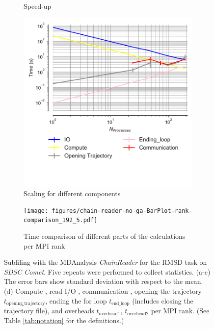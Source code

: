 \begin{figure}[!htb]
\begin{subfigure}{.4\textwidth}
  \caption{Speed-up}
  \label{fig:MPIspeedup-chain-reader}
\end{subfigure}
\bigskip
\begin{subfigure}{.45\textwidth}
  \includegraphics[width=\linewidth]{figures/IO_compute_scaling_traj_splitting-chain-reader.pdf}
  \captionsetup{format=hang}
  \caption{Scaling for different components}
  \label{fig:MPIscaling-chain-reader}
\end{subfigure}
\hfill
\begin{subfigure}{.5\textwidth}
  \texttt{[image: figures/chain-reader-no-ga-BarPlot-rank-comparison\_192\_5.pdf]}
  \captionsetup{format=hang}
  \caption{Time comparison of different parts of the calculations per MPI rank}
  \label{fig:MPIranks-split-chain-reader}
\end{subfigure}

\caption{Subfiling with the MDAnalysis \emph{ChainReader} for the RMSD task on \emph{SDSC Comet}.
Five repeats were performed to collect statistics.
(a-c) The error bars show standard deviation with respect to the mean.
(d) Compute \tcomp, read I/O \tIO, communication \tcomm, opening the trajectory $t_{\text{opening\_trajectory}}$, ending the for loop $t_{\text{end\_loop}}$ (includes closing the trajectory file),  and overheads $t_{\text{overhead1}}$, $t_{\text{overhead2}}$ per MPI rank. (See Table \ref{tab:notation} for the definitions.)}
\label{fig:MPIwithIO-split-chain-reader}
\end{figure}

